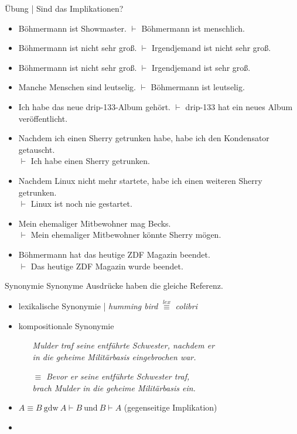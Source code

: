 \begin{frame}
  {Übung | Sind das Implikationen?}
  \begin{itemize}[<+->]\small
    \item Böhmermann ist Showmaster. $\vdash$ Böhmermann ist menschlich.
    \item Böhmermann ist nicht sehr groß. $\vdash$ Irgendjemand ist nicht sehr groß.
    \item Böhmermann ist nicht sehr groß. $\vdash$ Irgendjemand ist sehr groß.
    \item Manche Menschen sind leutselig. $\vdash$ Böhmermann ist leutselig.
    \item Ich habe das neue drip-133-Album gehört. $\vdash$ drip-133 hat ein neues Album veröffentlicht.
    \item Nachdem ich einen Sherry getrunken habe, habe ich den Kondensator getauscht.\\
      $\vdash$ Ich habe einen Sherry getrunken.
    \item Nachdem Linux nicht mehr startete, habe ich einen weiteren Sherry getrunken.\\
      $\vdash$ Linux ist noch nie gestartet.
    \item Mein ehemaliger Mitbewohner mag Becks.\\
      $\vdash$ Mein ehemaliger Mitbewohner könnte Sherry mögen.
    \item Böhmermann hat das heutige ZDF Magazin beendet.\\
      $\vdash$ Das heutige ZDF Magazin wurde beendet.
  \end{itemize}
\end{frame}

\begin{frame}
  {Synonymie}
  \onslide<+->
  \onslide<+->
  Synonyme Ausdrücke haben  \alert{die gleiche Referenz}.\\
  \Halbzeile
  \begin{itemize}[<+->]
    \item lexikalische Synonymie | \textit{humming bird} $\stackrel{lex}{\equiv}$ \textit{colibri}
      \Halbzeile
    \item kompositionale Synonymie
      \begin{itemize}[<+->]
        \item[ ] \textit{Mulder traf seine entführte Schwester, nachdem er\\
          in die geheime Militärbasis eingebrochen war.}
        \item[$\equiv$] \textit{Bevor er seine entführte Schwester traf,\\
          brach Mulder in die geheime Militärbasis ein.}
      \end{itemize}
    \Halbzeile
    \item \alert{$A\equiv B\ \text{gdw}\ A\vdash B\ \text{und}\ B\vdash A$} (gegenseitige Implikation)
    \item {}
  \end{itemize}
\end{frame}

